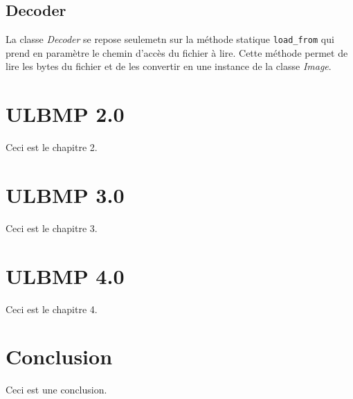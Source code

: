 \documentclass[utf8]{article}
\begin{document}
\subsection{Decoder}
La classe \textit{Decoder} se repose seulemetn sur la méthode statique \texttt{load_from} qui prend en paramètre le chemin d'accès du fichier à lire. Cette méthode permet de lire les bytes du fichier et de les convertir en une instance de la classe \textit{Image}.

\section{ULBMP 2.0}
Ceci est le chapitre 2.

\section{ULBMP 3.0}
Ceci est le chapitre 3.

\section{ULBMP 4.0}
Ceci est le chapitre 4.

\section{Conclusion}
Ceci est une conclusion.
\end{document}
